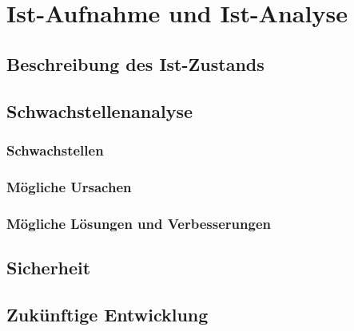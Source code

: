 \section{Ist-Aufnahme und Ist-Analyse}
\subsection{Beschreibung des Ist-Zustands}

\subsection{Schwachstellenanalyse}
\subsubsection{Schwachstellen}
\subsubsection{Mögliche Ursachen}
\subsubsection{Mögliche Lösungen und Verbesserungen}
\subsection{Sicherheit}
\subsection{Zukünftige Entwicklung}